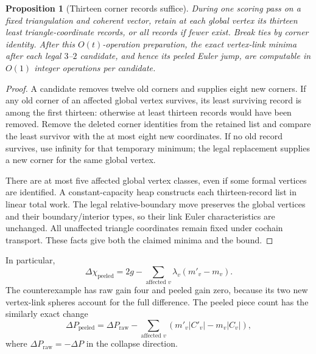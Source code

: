 \documentclass[11pt,letterpaper]{article}
\newtheorem{proposition}[theorem]{Proposition}
\theoremstyle{definition}
\theoremstyle{remark}
\begin{document}
\begin{proposition}[Thirteen corner records suffice]
\label{prop:peel}
During one scoring pass on a fixed triangulation and coherent vector,
retain at each global vertex its thirteen least triangle-coordinate
records, or all records if fewer exist. Break ties by corner identity.
After this $O(t)$-operation preparation, the exact vertex-link minima
after each legal $3$--$2$ candidate, and hence its peeled Euler jump, are
computable in $O(1)$ integer operations per candidate.
\end{proposition}
\begin{proof}
A candidate removes twelve old corners and supplies eight new corners.
If any old corner of an affected global vertex survives, its least
surviving record is among the first thirteen: otherwise at least thirteen
records would have been removed. Remove the deleted corner identities
from the retained list and compare the least survivor with the at most
eight new coordinates. If no old record survives, use infinity for that
temporary minimum; the legal replacement supplies a new corner for the
same global vertex.

There are at most five affected global vertex classes, even if some
formal vertices are identified. A constant-capacity heap constructs each
thirteen-record list in linear total work. The legal relative-boundary
move preserves the global vertices and their boundary/interior types,
so their link Euler characteristics are unchanged. All unaffected
triangle coordinates remain fixed under cochain transport. These facts
give both the claimed minima and the bound.
\end{proof}

In particular,
\begin{equation}
 \Delta\chi_{\mathrm{peeled}}
 =2g-\sum_{\text{affected }v}\lambda_v(m'_v-m_v).
 \label{eq:peeled}
\end{equation}
The counterexample has raw gain four and peeled gain zero, because its
two new vertex-link spheres account for the full difference. The peeled
piece count has the similarly exact change
\[
 \Delta P_{\mathrm{peeled}}
 =\Delta P_{\mathrm{raw}}
 -\sum_{\text{affected }v}(m'_v|C'_v|-m_v|C_v|),
\]
where $\Delta P_{\mathrm{raw}}=-\Delta P$ in the collapse direction.
\end{document}
